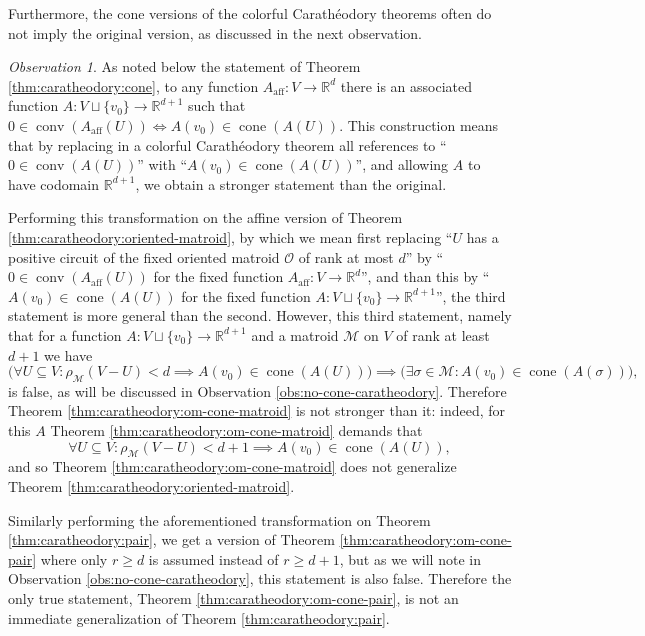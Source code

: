 \documentclass[a4paper,11pt,reqno, english]{amsart}
\theoremstyle{definition}
\theoremstyle{remark}
\newtheorem{observation}[theorem]{Observation}
\newcommand\R{\mathbb R}
\DeclareMathOperator{\cone}{\mathrm{cone}}
\DeclareMathOperator{\conv}{\mathrm{conv}}
\begin{document}
Furthermore, the cone versions of the colorful Carath\'eodory theorems often do not imply the original version, as discussed in the next observation.
\begin{observation}\label{obs:conv-vs-cone-in-oms}
    As noted below the statement of Theorem \ref{thm:caratheodory:cone}, to any function $A_{\operatorname{aff}}\colon V\to\R^{d}$ there is an associated function $A\colon {V\sqcup\{v_0\}}\to\R^{d+1}$ such that $0\in\conv(A_{\operatorname{aff}}(U))\iff A(v_0)\in\cone(A(U))$. 
 This construction means that by replacing in a colorful Carath\'eodory theorem all references to ``$0\in\conv(A(U))$'' with ``$A(v_0)\in\cone(A(U))$'', and allowing $A$ to have codomain $\R^{d+1}$, we obtain a stronger statement than the original.
    
 Performing this transformation on the affine version of Theorem \ref{thm:caratheodory:oriented-matroid}, by which we mean first replacing ``$U$ has a positive circuit of the fixed oriented matroid $\mathscr{O}$ of rank at most $d$'' by ``$0\in\conv(A_{\operatorname{aff}}(U))$ for the fixed function $A_{\operatorname{aff}}\colon V\to\R^d$'', and than this by ``$A(v_0)\in\cone(A(U))$ for the fixed function $A\colon {V\sqcup\{v_0\}}\to\R^{d+1}$'', the third statement is more general than the second. However, this third statement, namely that for a function $A\colon {V\sqcup\{v_0\}}\to\R^{d+1}$ and a matroid $\mathscr{M}$ on $V$ of rank at least $d+1$ we have 
    \[
        \big(\forall U\subseteq V\colon\rho_\mathscr{M}(V-U)<d\implies A(v_0)\in\cone(A(U))\big)\implies\big(\exists\sigma\in\mathscr{M}\colon A(v_0)\in\cone(A(\sigma))\big),
    \]
    is false, as will be discussed in Observation \ref{obs:no-cone-caratheodory}. Therefore Theorem \ref{thm:caratheodory:om-cone-matroid} is not stronger than it: indeed, for this $A$ Theorem \ref{thm:caratheodory:om-cone-matroid} demands that 
    \[
        \forall U\subseteq V\colon \rho_\mathscr{M}(V-U)<d+1\implies A(v_0)\in \cone(A(U)),
    \]
    and so Theorem \ref{thm:caratheodory:om-cone-matroid} does not generalize Theorem \ref{thm:caratheodory:oriented-matroid}.

    Similarly performing the aforementioned transformation on Theorem \ref{thm:caratheodory:pair}, we get a version of Theorem \ref{thm:caratheodory:om-cone-pair} where only $r\geq d$ is assumed instead of $r\geq d+1$, but as we will note in Observation \ref{obs:no-cone-caratheodory}, this statement is also false. Therefore the only true statement, Theorem \ref{thm:caratheodory:om-cone-pair}, is not an immediate generalization of Theorem \ref{thm:caratheodory:pair}. 
\end{observation}
\end{document}
